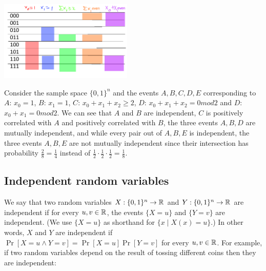 \begin{marginfigure}
\centering
\includegraphics[width=\linewidth, height=1.5in, keepaspectratio]{../figure/independencecoins.png}
\caption{Consider the sample space \(\{0,1\}^n\) and the events
\(A,B,C,D,E\) corresponding to \(A\): \(x_0=1\), \(B\): \(x_1=1\),
\(C\): \(x_0+x_1+x_2 \geq 2\), \(D\): \(x_0+x_1+x_2 = 0 mod 2\) and
\(D\): \(x_0+x_1 = 0 mod 2\). We can see that \(A\) and \(B\) are
independent, \(C\) is positively correlated with \(A\) and positively
correlated with \(B\), the three events \(A,B,D\) are mutually
independent, and while every pair out of \(A,B,E\) is independent, the
three events \(A,B,E\) are not mutually independent since their
intersection has probability \(\tfrac{2}{8}=\tfrac{1}{4}\) instead of
\(\tfrac{1}{2}\cdot \tfrac{1}{2} \cdot \tfrac{1}{2} = \tfrac{1}{8}\).}
\label{independencecoinsfig}
\end{marginfigure}

\subsection{Independent random
variables}\label{Independent-random-variables}

We say that two random variables \(X:\{0,1\}^n \rightarrow {\mathbb{R}}\) and
\(Y:\{0,1\}^n \rightarrow {\mathbb{R}}\) are independent if for every
\(u,v \in {\mathbb{R}}\), the events \(\{ X=u \}\) and \(\{ Y=v \}\) are
independent. (We use \(\{ X=u \}\) as shorthand for
\(\{ x \;|\; X(x)=u \}\).) In other words, \(X\) and \(Y\) are
independent if \(\Pr[ X=u \wedge Y=v]=\Pr[X=u]\Pr[Y=v]\) for every
\(u,v \in {\mathbb{R}}\). For example, if two random variables depend on the
result of tossing different coins then they are independent:

\hypertarget{indcoins}{}

